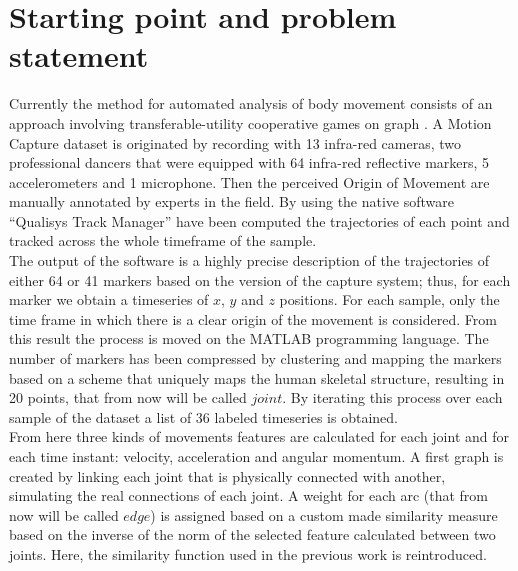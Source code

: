 \section{Starting point and problem statement}
\label{sec:starting_point}
Currently the method for automated analysis of body movement consists of an approach involving transferable-utility cooperative games on graph \cite{kolykhalova:2020}.
A Motion Capture dataset is originated by recording with 13 infra-red cameras, two professional dancers that were equipped with 64 infra-red reflective markers, 5 accelerometers and 1 microphone.
Then the perceived Origin of Movement are manually annotated by experts in the field.
By using the native software “Qualisys Track Manager” have been computed the trajectories of each point and tracked across the whole timeframe of the sample.\\
The output of the software is a highly precise description of the trajectories of either 64 or 41 markers based on the version of the capture system; thus, for each marker we obtain a timeseries of $x$, $y$ and $z$ positions.
For each sample, only the time frame in which there is a clear origin of the movement is considered.
From this result the process is moved on the MATLAB programming language. 
The number of markers has been compressed by clustering and mapping the markers based on a scheme that uniquely maps the human skeletal structure, resulting in 20 points, that from now will be called $joint$.
By iterating this process over each sample of the dataset a list of 36 labeled timeseries is obtained.\\
From here three kinds of movements features are calculated for each joint and for each time instant: velocity, acceleration and angular momentum.
A first graph is created by linking each joint that is physically connected with another, simulating the real connections of each joint.
A weight for each arc (that from now will be called $edge$) is assigned based on a custom made similarity measure based on the inverse of the norm of the selected feature calculated between two joints.
Here, the similarity function used in the previous work is reintroduced.
